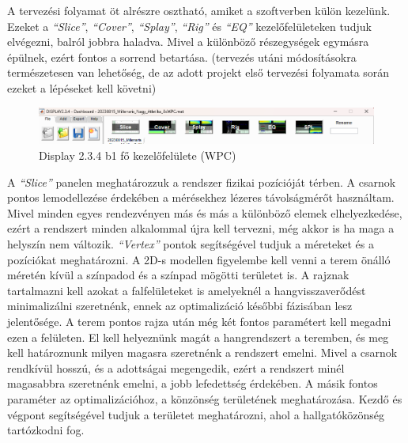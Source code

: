 A tervezési folyamat öt alrészre osztható, amiket a szoftverben külön kezelünk.
Ezeket a \textit{``Slice''}, \textit{``Cover''}, \textit{``Splay''}, \textit{``Rig''} és \textit{``EQ''} kezelőfelületeken tudjuk elvégezni,
balról jobbra haladva. Mivel a különböző részegységek egymásra épülnek, ezért fontos a sorrend betartása.
(tervezés utáni módosításokra természetesen van lehetőség, de az adott projekt első tervezési folyamata során ezeket a lépéseket kell követni)
\begin{figure}[H]
	\centering
	\includegraphics[width=\textwidth, keepaspectratio]{figures/display_wpc_0_1.png}
	\caption{Display 2.3.4 b1 fő kezelőfelülete (WPC)}\label{fig:display_wpc_0_1}
\end{figure}
A \textit{``Slice''} panelen meghatározzuk a rendszer fizikai pozícióját térben. A csarnok
pontos lemodellezése érdekében a mérésekhez lézeres távolságmérőt használtam.
Mivel minden egyes rendezvényen más és más a különböző elemek elhelyezkedése, ezért a
rendszert minden alkalommal újra kell tervezni, még akkor is ha maga a helyszín nem változik.
\textit{``Vertex''} pontok segítségével tudjuk a méreteket és a pozíciókat meghatározni.
A 2D-s modellen figyelembe kell venni a terem önálló méretén kívül a színpadod és a színpad mögötti területet is.
A rajznak tartalmazni kell azokat a falfelületeket is amelyeknél a hangvisszaverődést minimalizálni szeretnénk,
ennek az optimalizáció későbbi fázisában lesz jelentősége.
A terem pontos rajza után még két fontos paramétert kell megadni ezen a felületen.
El kell helyeznünk magát a hangrendszert a teremben, és meg kell határoznunk milyen magasra szeretnénk a rendszert emelni.
Mivel a csarnok rendkívül hosszú, és a adottságai megengedik, ezért a rendszert minél magasabbra szeretnénk emelni,
a jobb lefedettség érdekében.
A másik fontos paraméter az optimalizációhoz, a könzönség területének meghatározása. Kezdő és végpont segítségével
tudjuk a területet meghatározni, ahol a hallgatóközönség tartózkodni fog.
